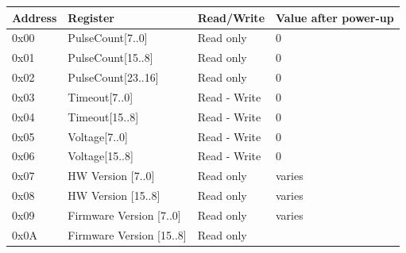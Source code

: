 \documentclass[a4paper]{article}
\begin{document}
\begin{flushleft}
\tablefirsthead{}
\tablehead{}
\tabletail{}
\tablelasttail{}
\begin{supertabular}{|m{0.7976598in}|m{1.9136599in}|m{1.3045598in}|m{1.1761599in}|}
\hline
{\bfseries Address} &
{\bfseries Register} &
{\bfseries Read/Write} &
{\bfseries Value after power-up}\\\hline
{ 0x00} &
{ PulseCount[7..0]} &
{ Read only} &
{ 0}\\\hline
{ 0x01} &
{ PulseCount[15..8]} &
{ Read only} &
{ 0}\\\hline
{ 0x02} &
{ PulseCount[23..16]} &
{ Read only} &
{ 0}\\\hline
{ 0x03} &
{ Timeout[7..0]} &
{ Read - Write} &
{ 0}\\\hline
{ 0x04} &
{ Timeout[15..8]} &
{ Read - Write} &
{ 0}\\\hline
{ 0x05} &
{ Voltage[7..0]} &
{ Read - Write} &
{ 0}\\\hline
{ 0x06} &
{ Voltage[15..8]} &
{ Read - Write} &
{ 0}\\\hline
{ 0x07} &
{ HW Version [7..0]} &
{ Read only} &
{ varies\footnotemark{}}\\\hline
{ 0x08} &
{ HW Version [15..8]} &
{ Read only} &
{ varies}\\\hline
{ 0x09} &
{ Firmware Version [7..0]} &
{ Read only} &
{ varies}\\\hline
{ 0x0A} &
{ Firmware Version [15..8]} &
{ Read only} &

\end{supertabular}
\end{flushleft}
\end{document}
